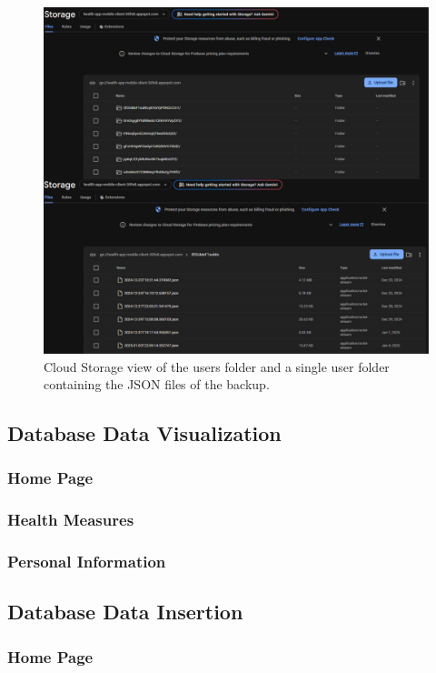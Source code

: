 \begin{figure}
    \includegraphics[width=1.0\linewidth]{./images/backup.jpg}
    \caption{Cloud Storage view of the users folder and a single user folder containing the JSON files of the backup.}
\end{figure}
\subsection{Database Data Visualization}
\subsubsection{Home Page}
\subsubsection{Health Measures}
\subsubsection{Personal Information}

\subsection{Database Data Insertion}
\subsubsection{Home Page}
